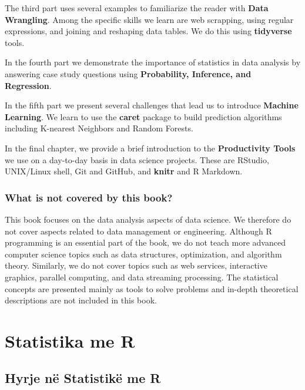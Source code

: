\documentclass[openany]{book}
\begin{document}
The third part uses several examples to familiarize the reader with \textbf{Data Wrangling}. Among the specific skills we learn are web scrapping, using regular expressions, and joining and reshaping data tables. We do this using \textbf{tidyverse} tools.

In the fourth part we demonstrate the importance of statistics in data analysis by answering case study questions using \textbf{Probability, Inference, and Regression}.

In the fifth part we present several challenges that lead us to introduce \textbf{Machine Learning}. We learn to use the \textbf{caret} package to build prediction algorithms including K-nearest Neighbors and Random Forests.

In the final chapter, we provide a brief introduction to the \textbf{Productivity Tools} we use on a day-to-day basis in data science projects. These are RStudio, UNIX/Linux shell, Git and GitHub, and \textbf{knitr} and R Markdown.

\hypertarget{what-is-not-covered-by-this-book}{%
\section*{What is not covered by this book?}\label{what-is-not-covered-by-this-book}}


This book focuses on the data analysis aspects of data science. We therefore do not cover aspects related to data management or engineering. Although R programming is an essential part of the book, we do not teach more advanced computer science topics such as data structures, optimization, and algorithm theory. Similarly, we do not cover topics such as web services, interactive graphics, parallel computing, and data streaming processing. The statistical concepts are presented mainly as tools to solve problems and in-depth theoretical descriptions are not included in this book.

\hypertarget{part-statistika-me-r}{%
\part{Statistika me R}\label{part-statistika-me-r}}

\hypertarget{hyrje-ne-statistike-me-r}{%
\chapter{Hyrje në Statistikë me R}\label{hyrje-ne-statistike-me-r}}
\end{document}
